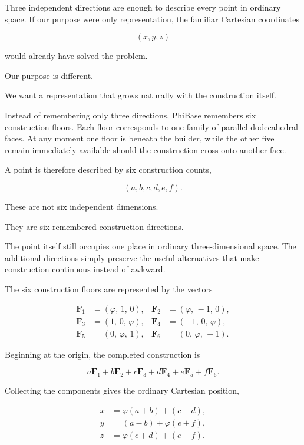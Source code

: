 Three independent directions are enough to describe every point in ordinary space. If our purpose were only representation, the familiar Cartesian coordinates

\[
(x,y,z)
\]

would already have solved the problem.

Our purpose is different.

We want a representation that grows naturally with the construction itself.

Instead of remembering only three directions, PhiBase remembers six construction floors. Each floor corresponds to one family of parallel dodecahedral faces. At any moment one floor is beneath the builder, while the other five remain immediately available should the construction cross onto another face.

A point is therefore described by six construction counts,

\[
(a,b,c,d,e,f).
\]

These are not six independent dimensions.

They are six remembered construction directions.

The point itself still occupies one place in ordinary three-dimensional space. The additional directions simply preserve the useful alternatives that make construction continuous instead of awkward.

The six construction floors are represented by the vectors

\[
\begin{aligned}
\mathbf{F}_1 &= (\varphi,\,1,\,0), &
\mathbf{F}_2 &= (\varphi,\,-1,\,0), \\
\mathbf{F}_3 &= (1,\,0,\,\varphi), &
\mathbf{F}_4 &= (-1,\,0,\,\varphi), \\
\mathbf{F}_5 &= (0,\,\varphi,\,1), &
\mathbf{F}_6 &= (0,\,\varphi,\,-1).
\end{aligned}
\]

Beginning at the origin, the completed construction is

\[
a\mathbf{F}_1 + b\mathbf{F}_2 + c\mathbf{F}_3 + d\mathbf{F}_4 + e\mathbf{F}_5 + f\mathbf{F}_6.
\]

Collecting the components gives the ordinary Cartesian position,

\[
\begin{aligned}
x &= \varphi(a+b) + (c-d), \\
y &= (a-b) + \varphi(e+f), \\
z &= \varphi(c+d) + (e-f).
\end{aligned}
\]

